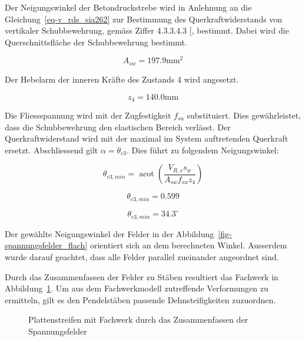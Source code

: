 \documentclass[
  12pt,
  letterpaper,
  egregdoesnotlikesansseriftitles]{scrreprt}
\begin{document}
Der Neigungswinkel der Betondruckstrebe wird in Anlehnung an die
Gleichung~\ref{eq-v_rds_sia262} zur Bestimmung des Querkraftwiderstands
von vertikaler Schubbewehrung, gemäss Ziffer 4.3.3.4.3
{[}\citeproc{ref-SIA2013a}{6}{]}, bestimmt. Dabei wird die
Querschnittsfläche der Schubbewehrung bestimmt.

\begin{equation}A_{s w} = 197.9 \text{mm}^{2}\end{equation}

Der Hebelarm der inneren Kräfte des Zustands 4 wird angesetzt.

\begin{equation}z_{4} = 140.0 \text{mm}\end{equation}

Die Fliessspannung wird mit der Zugfestigkeit \(f_{su}\) substituiert.
Dies gewährleistet, dass die Schubbewehrung den elastischen Bereich
verlässt. Der Querkraftwiderstand wird mit der maximal im System
auftretenden Querkraft ersetzt. Abschliessend gilt
\(\alpha = \theta_{c3}\). Dies führt zu folgendem Neigungswinkel:

\begin{equation}\theta_{c3,min} = \operatorname{acot}{\left(\frac{V_{R,s} s_{w}}{A_{s w} f_{su} z_{4}} \right)}\end{equation}

\begin{equation}\theta_{c3,min} = 0.599\end{equation}

\begin{equation}\theta_{c3,min} = 34.3 ^\circ\end{equation}

Der gewählte Neigungswinkel der Felder in der
Abbildung~\ref{fig-spannungsfelder_flach} orientiert sich an dem
berechneten Winkel. Ausserdem wurde darauf geachtet, dass alle Felder
parallel zueinander angeordnet sind.

Durch das Zusammenfassen der Felder zu Stäben resultiert das Fachwerk in
Abbildung~\ref{fig-fachwerk_flach}. Um aus dem Fachwerkmodell
zutreffende Verformungen zu ermitteln, gilt es den Pendelstäben passende
Dehnsteifigkeiten zuzuordnen.

\begin{figure}[H]


\caption{\label{fig-fachwerk_flach}Plattenstreifen mit Fachwerk durch
das Zusammenfassen der Spannungsfelder}

\end{figure}%
\end{document}
